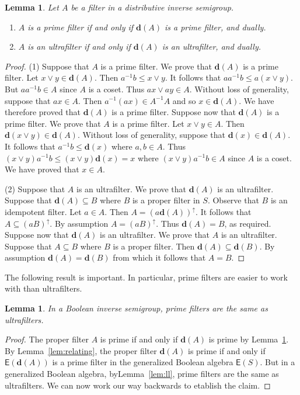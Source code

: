 \documentclass[a4paper]{amsart}
\newtheorem{lemma}[theorem]{Lemma}
\begin{document}
\begin{lemma}\label{lem:d-is-extremal} Let $A$ be a filter in a distributive inverse semigroup.
\begin{enumerate}
\item $A$ is a prime filter if and only if $\mathbf{d}(A)$ is a prime filter, and dually.
\item $A$ is an ultrafilter if and only if $\mathbf{d}(A)$ is an ultrafilter, and dually.
 \end{enumerate}
\end{lemma}
\begin{proof} (1) Suppose that $A$ is a prime filter. We prove that $\mathbf{d}(A)$ is a prime filter.
Let $x \vee y \in \mathbf{d}(A)$.
Then $a^{-1}b \leq x \vee y$.
It follows that $aa^{-1}b \leq a(x \vee y)$.
But $aa^{-1}b \in A$ since $A$ is a coset.
Thus $ax \vee ay \in A$.
Without loss of generality, suppose that $ax \in A$.
Then $a^{-1}(ax)  \in A^{-1}A$ and so $x \in \mathbf{d}(A)$.
We have therefore proved that $\mathbf{d}(A)$ is a prime filter.
Suppose now that $\mathbf{d}(A)$ is a prime filter.
We prove that $A$ is a prime filter.
Let $x \vee y \in A$.
Then $\mathbf{d}(x \vee y) \in \mathbf{d}(A)$.
Without loss of generality, suppose that $\mathbf{d}(x) \in \mathbf{d}(A)$.
It follows that $a^{-1}b \leq \mathbf{d}(x)$ where $a,b \in A$.
Thus $(x \vee y)a^{-1}b \leq (x \vee y)\mathbf{d}(x) = x$ where $(x \vee y)a^{-1}b \in A$ since $A$ is a coset.
We have proved that $x \in A$.

(2) Suppose that $A$ is an ultrafilter.
We prove that $\mathbf{d}(A)$ is an ultrafilter.
Suppose that $\mathbf{d}(A) \subseteq B$ where $B$ is a proper filter in $S$.
Observe that $B$ is an idempotent filter.
Let $a \in A$.
Then $A = (a\mathbf{d}(A))^{\uparrow}$.
It follows that $A \subseteq (aB)^{\uparrow}$.
By assumption $A = (aB)^{\uparrow}$.
Thus $\mathbf{d}(A) = B$, as required.
Suppose now that  $\mathbf{d}(A)$ is an ultrafilter.
We prove that $A$ is an ultrafilter.
Suppose that $A \subseteq B$ where $B$ is a proper filter.
Then $\mathbf{d}(A) \subseteq \mathbf{d}(B)$.
By assumption $\mathbf{d}(A) = \mathbf{d}(B)$
from which it follows that $A = B$.
\end{proof}

The following result is important.
In particular, prime filters are easier to work with than ultrafilters.

\begin{lemma}\label{lem:prime-equals-uf} In a Boolean inverse semigroup,
prime filters are the same as ultrafilters.
\end{lemma}
\begin{proof} The proper filter $A$ is prime if and only if $\mathbf{d}(A)$ is prime by Lemma~\ref{lem:d-is-extremal}.
By Lemma~\ref{lem:relating}, the proper filter $\mathbf{d}(A)$ is prime if and only if $\mathsf{E}(\mathbf{d}(A))$ is a prime 
filter in the generalized Boolean algebra $\mathsf{E}(S)$.
But in a generalized Boolean algebra, byLemma~\ref{lem:ll}, prime filters are the same as ultrafilters.
We can now work our way backwards to etablish the claim.
\end{proof}
\end{document}
